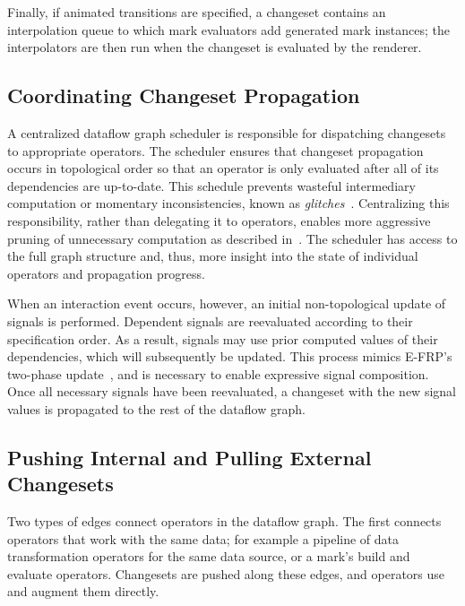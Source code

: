 Finally, if animated transitions are specified, a changeset contains an
interpolation queue to which mark evaluators add generated mark instances; the
interpolators are then run when the changeset is evaluated by the renderer.

\vspace{-20pt}

\subsection{Coordinating Changeset Propagation}
\label{sec:propagation}

\vspace{-7pt}

A centralized dataflow graph scheduler is responsible for dispatching changesets
to appropriate operators. The scheduler ensures that changeset propagation
occurs in topological order so that an operator is only evaluated after all of
its dependencies are up-to-date. This schedule prevents wasteful intermediary
computation or momentary inconsistencies, known as
\emph{glitches}~\cite{cooper:embedding}. Centralizing this responsibility,
rather than delegating it to operators, enables more aggressive pruning of
unnecessary computation as described in~. The scheduler has
access to the full graph structure and, thus, more insight into the state of
individual operators and propagation progress.

When an interaction event occurs, however, an initial non-topological update of
signals is performed. Dependent signals are reevaluated according to their
specification order. As a result, signals may use prior computed values of their
dependencies, which will subsequently be updated. This process mimics E-FRP's
two-phase update~\cite{wan:efrp}, and is necessary to enable expressive signal
composition. Once all necessary signals have been reevaluated, a changeset with
the new signal values is propagated to the rest of the dataflow graph.

\subsection{Pushing Internal and Pulling External Changesets}

\vspace{-7pt}

Two types of edges connect operators in the dataflow graph. The first connects
operators that work with the same data; for example a pipeline of data
transformation operators for the same data source, or a mark's build and
evaluate operators. Changesets are pushed along these edges, and operators
use and augment them directly.

